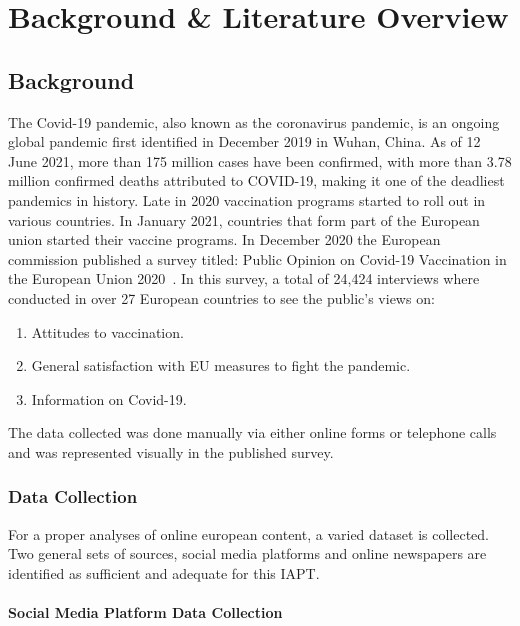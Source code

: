 \chapter{Background \& Literature Overview}

\section{Background}

The Covid-19 pandemic, also known as the coronavirus pandemic, is an ongoing global pandemic first identified in December 2019 in Wuhan, China.
As of 12 June 2021, more than 175 million cases have been confirmed, with more than 3.78 million confirmed deaths attributed to COVID-19, making it one of the deadliest pandemics in history.
Late in 2020 vaccination programs started to roll out in various countries.
In January 2021, countries that form part of the European union started their vaccine programs.
In December 2020 the European commission published a survey titled: Public Opinion on Covid-19 Vaccination in the European Union 2020~\citep{eupublicopinion}.
In this survey, a total of 24,424 interviews where conducted in over 27 European countries to see the public's views on:

\begin{enumerate}
  \item Attitudes to vaccination.
  \item General satisfaction with EU measures to fight the pandemic.
  \item Information on Covid-19.
\end{enumerate}
\noindent The data collected was done manually via either online forms or telephone calls and was represented visually in the published survey.

\subsection{Data Collection}

For a proper analyses of online european content, a varied dataset is collected.
Two general sets of sources, social media platforms and online newspapers are identified as sufficient and adequate for this \ac{IAPT}.

\subsubsection{Social Media Platform Data Collection}

